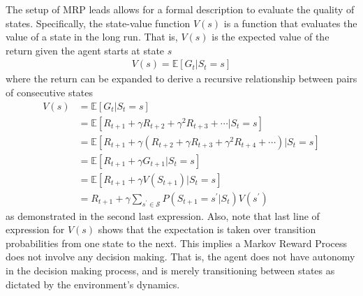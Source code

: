 \documentclass[12pt]{report}
\begin{document}
The setup of MRP leads allows for a formal description to evaluate the quality of states. Specifically, the state-value function $V(s)$ is a function that evaluates the value of a state in the long run. That is, $V(s)$ is the expected value of the return given the agent starts at state $s$
\begin{align}
    V(s) = \mathbb{E}[G_t|S_t = s] \label{eq:v-func-org}
\end{align}
where the return can be expanded to derive a recursive relationship between pairs of consecutive states
\begin{align}
    V(s) &= \mathbb{E}[G_t|S_t = s] \nonumber\\
    &= \mathbb{E}[R_{t+1} + \gamma R_{t+2} + \gamma^2 R_{t+3} + \cdots | S_t = s] \nonumber\\
    &= \mathbb{E}[R_{t+1} + \gamma \left(R_{t+2} + \gamma R_{t+3} + \gamma^2 R_{t+4} + \cdots \right) | S_t = s] \nonumber\\
    &= \mathbb{E}[R_{t+1}+\gamma G_{t+1} | S_t = s] \nonumber\\
    &= \mathbb{E}[R_{t+1}+\gamma V(S_{t+1}) | S_t = s] \nonumber\\
    &= R_{t+1} + \gamma \sum_{s^\prime \in \mathcal{S}} P(S_{t+1}=s^\prime|S_t) V(s^\prime) \nonumber
\end{align}
as demonstrated in the second last expression. Also, note that last line of expression for $V(s)$ shows that the expectation is taken over transition probabilities from one state to the next. This implies a Markov Reward Process does not involve any decision making. That is, the agent does not have autonomy in the decision making process, and is merely transitioning between states as dictated by the environment's dynamics.\\
\end{document}
